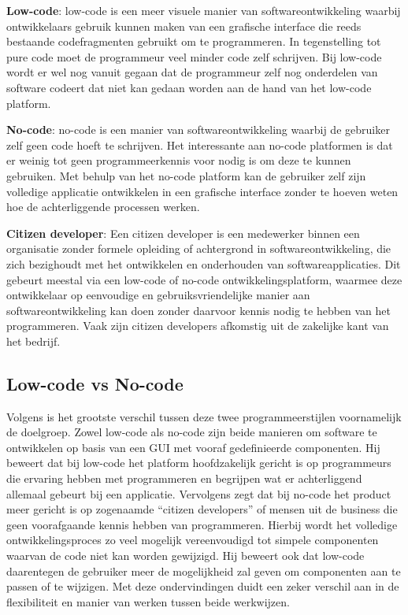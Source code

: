 \textbf{Low-code}: low-code is een meer visuele manier van softwareontwikkeling waarbij ontwikkelaars gebruik kunnen maken van een grafische interface die reeds bestaande codefragmenten gebruikt om te programmeren. In tegenstelling tot pure code moet de programmeur veel minder code zelf schrijven. Bij low-code wordt er wel nog vanuit gegaan dat de programmeur zelf nog onderdelen van software codeert dat niet kan gedaan worden aan de hand van het low-code platform. \autocite{Spain2022}

\vspace{\baselineskip}

\textbf{No-code}: no-code is een manier van softwareontwikkeling waarbij de gebruiker zelf geen code hoeft te schrijven. Het interessante aan no-code platformen is dat er weinig tot geen programmeerkennis voor nodig is om deze te kunnen gebruiken. Met behulp van het no-code platform kan de gebruiker zelf zijn volledige applicatie ontwikkelen in een grafische interface zonder te hoeven weten hoe de achterliggende processen werken. \autocite{Kirvan2024}

\vspace{\baselineskip}

\textbf{Citizen developer}: Een citizen developer is een medewerker binnen een organisatie zonder formele opleiding of achtergrond in softwareontwikkeling, die zich bezighoudt met het ontwikkelen en onderhouden van softwareapplicaties. Dit gebeurt meestal via een low-code of no-code ontwikkelingsplatform, waarmee deze ontwikkelaar op eenvoudige en gebruiksvriendelijke manier aan softwareontwikkeling kan doen zonder daarvoor kennis nodig te hebben van het programmeren. Vaak zijn citizen developers afkomstig uit de zakelijke kant van het bedrijf. \autocite{Kirvan2023}

\subsection{Low-code vs No-code}
\label{sec:Low-code vs No-code}

Volgens \textcite{Oluwaseyi2024} is het grootste verschil tussen deze twee programmeerstijlen voornamelijk de doelgroep. Zowel low-code als no-code zijn beide manieren om software te ontwikkelen op basis van een GUI met vooraf gedefinieerde componenten. Hij beweert dat bij low-code het platform hoofdzakelijk gericht is op programmeurs die ervaring hebben met programmeren en begrijpen wat er achterliggend allemaal gebeurt bij een applicatie. Vervolgens zegt \textcite{Oluwaseyi2024} dat bij no-code het product meer gericht is op zogenaamde “citizen developers” of mensen uit de business die geen voorafgaande kennis hebben van programmeren. Hierbij wordt het volledige ontwikkelingsproces zo veel mogelijk vereenvoudigd tot simpele componenten waarvan de code niet kan worden gewijzigd. Hij beweert ook dat low-code daarentegen de gebruiker meer de mogelijkheid zal geven om componenten aan te passen of te wijzigen. Met deze ondervindingen duidt \textcite{Oluwaseyi2024} een zeker verschil aan in de flexibiliteit en manier van werken tussen beide werkwijzen.

